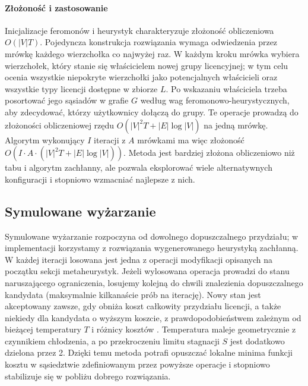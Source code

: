 \paragraph{Złożoność i zastosowanie}
Inicjalizacje feromonów i heurystyk charakteryzuje złożoność obliczeniowa $O(|V|T)$. Pojedyncza konstrukcja rozwiązania wymaga odwiedzenia przez mrówkę każdego wierzchołka co najwyżej raz. W każdym kroku mrówka wybiera wierzchołek, który stanie się właścicielem nowej grupy licencyjnej; w tym celu ocenia wszystkie niepokryte wierzchołki jako potencjalnych właścicieli oraz wszystkie typy licencji dostępne w zbiorze $L$. Po wskazaniu właściciela trzeba posortować jego sąsiadów w grafie $G$ według wag feromonowo-heurystycznych, aby zdecydować, którzy użytkownicy dołączą do grupy. Te operacje prowadzą do złożoności obliczeniowej rzędu $O(|V|^2 T + |E|\log |V|)$ na jedną mrówkę. Algorytm wykonujący $I$ iteracji z $A$ mrówkami ma więc złożoność $O\!\left(I \cdot A \cdot (|V|^2 T + |E|\log |V|)\right)$. Metoda jest bardziej złożona obliczeniowo niż tabu i algorytm zachłanny, ale pozwala eksplorować wiele alternatywnych konfiguracji i stopniowo wzmacniać najlepsze z nich.


\subsection{Symulowane wyżarzanie }\label{subsec:sa}
Symulowane wyżarzanie rozpoczyna od dowolnego dopuszczalnego przydziału; w implementacji korzystamy z rozwiązania wygenerowanego heurystyką zachłanną. W każdej iteracji losowana jest jedna z operacji modyfikacji opisanych na początku sekcji metaheurystyk. Jeżeli wylosowana operacja prowadzi do stanu naruszającego ograniczenia, losujemy kolejną do chwili znalezienia dopuszczalnego kandydata (maksymalnie kilkanaście prób na iterację). Nowy stan jest akceptowany zawsze, gdy obniża koszt całkowity przydziału licencji, a także niekiedy dla kandydata o wyższym koszcie, z prawdopodobieństwem zależnym od bieżącej temperatury \(T\) i różnicy kosztów \cite{kirkpatrick1983}. Temperatura maleje geometrycznie z czynnikiem chłodzenia, a po przekroczeniu limitu stagnacji \(S\) jest dodatkowo dzielona przez 2. Dzięki temu metoda potrafi opuszczać lokalne minima funkcji kosztu w sąsiedztwie zdefiniowanym przez powyższe operacje i stopniowo stabilizuje się w pobliżu dobrego rozwiązania.

